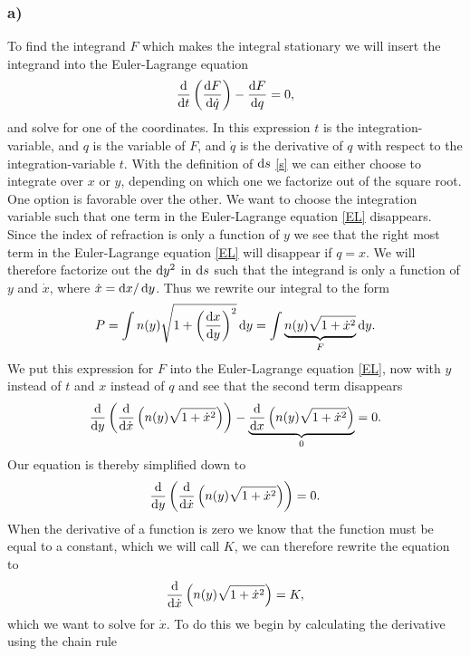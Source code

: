 \documentclass[12pt,twoside]{article}
\begin{document}
\subsubsection*{a)}
To find the integrand $F$ which makes the integral stationary we will insert the integrand into the Euler-Lagrange equation
\begin{equation}
  \dv{}{t}\left( \dv{F}{\dot{q}} \right) - \dv{F}{q} = 0, \label{EL}
\end{equation}
and solve for one of the coordinates. In this expression $t$ is the integration-variable, and $q$ is the variable of $F$, and $\dot{q}$ is the derivative of $q$ with respect to the integration-variable $t$. With the definition of $\dif s$ \eqref{s} we can either choose to integrate over $x$ or $y$, depending on which one we factorize out of the square root. One option is favorable over the other. We want to choose the integration variable such that one term in the Euler-Lagrange equation \eqref{EL} disappears. Since the index of refraction is only a function of $y$ we see that the right most term in the Euler-Lagrange equation \eqref{EL} will disappear if $q=x$. We will therefore factorize out the $\dif y^2$ in $\dif s$ such that the integrand is only a function of $y$ and $\dot{x}$, where $\dot{x}=\dif x/\dif y$.
Thus we rewrite our integral to the form
\begin{equation}
  P = \int n(y) \sqrt{1+\left(\frac{\dif x}{\dif y}\right)^2} \dif y = \int \underbrace{n(y) \sqrt{1+\dot{x}^2}}_{F} \dif y.
\end{equation}
We put this expression for $F$ into the Euler-Lagrange equation \eqref{EL}, now with $y$ instead of $t$ and $x$ instead of $q$ and see that the second term disappears
\begin{equation}
  \dv{}{y}\left(\dv{}{\dot{x}}\left( n(y) \sqrt{1+\dot{x}^2} \right)\right) - \underbrace{\dv{}{x}\left(n(y) \sqrt{1+\dot{x}^2}\right)}_0 = 0. \label{EL_2}
\end{equation}
Our equation is thereby simplified down to
\begin{equation}
  \dv{}{y}\left(\dv{}{\dot{x}}\left( n(y) \sqrt{1+\dot{x}^2} \right)\right) = 0.
\end{equation}
When the derivative of a function is zero we know that the function must be equal to a constant, which we will call $K$, we can therefore rewrite the equation to
\begin{equation}
  \dv{}{\dot{x}}\left( n(y) \sqrt{1+\dot{x}^2}\right) = K,
\end{equation}
which we want to solve for $\dot{x}$. To do this we begin by calculating the derivative using the chain rule
\end{document}
